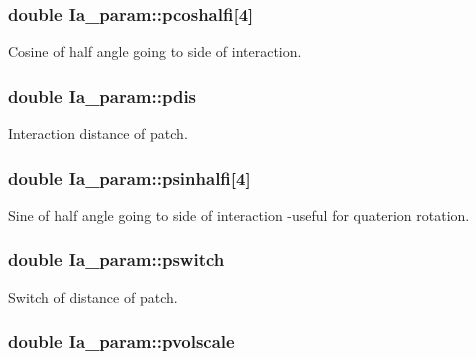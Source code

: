 \hypertarget{class_ia__param_a6836ed2a44748c8b1f71219c01b5a713}{
\subsubsection[{pcoshalfi}]{\setlength{\rightskip}{0pt plus 5cm}double Ia\+\_\+param\+::pcoshalfi\mbox{[}4\mbox{]}}}\label{class_ia__param_a6836ed2a44748c8b1f71219c01b5a713}


Cosine of half angle going to side of interaction. 

\hypertarget{class_ia__param_a63ddf4536d542af40513d4c057fc63d8}{
\subsubsection[{pdis}]{\setlength{\rightskip}{0pt plus 5cm}double Ia\+\_\+param\+::pdis}}\label{class_ia__param_a63ddf4536d542af40513d4c057fc63d8}


Interaction distance of patch. 

\hypertarget{class_ia__param_a52fcecbb5171074f634ebe68a1037d0d}{
\subsubsection[{psinhalfi}]{\setlength{\rightskip}{0pt plus 5cm}double Ia\+\_\+param\+::psinhalfi\mbox{[}4\mbox{]}}}\label{class_ia__param_a52fcecbb5171074f634ebe68a1037d0d}


Sine of half angle going to side of interaction -\/useful for quaterion rotation. 

\hypertarget{class_ia__param_a472503a5c3cb1e523fab0fba256b6908}{
\subsubsection[{pswitch}]{\setlength{\rightskip}{0pt plus 5cm}double Ia\+\_\+param\+::pswitch}}\label{class_ia__param_a472503a5c3cb1e523fab0fba256b6908}


Switch of distance of patch. 

\hypertarget{class_ia__param_ae90674c64fb9e8d68e964114bb029709}{
\subsubsection[{pvolscale}]{\setlength{\rightskip}{0pt plus 5cm}double Ia\+\_\+param\+::pvolscale}}\label{class_ia__param_ae90674c64fb9e8d68e964114bb029709}


